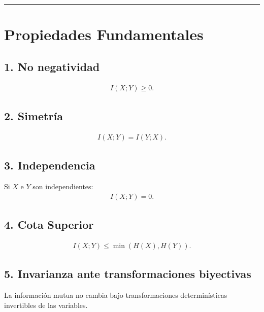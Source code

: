\documentclass[letterpaper,10pt,english]{jupyterBook}
\begin{document}
\bigskip\hrule\bigskip



\section{Propiedades Fundamentales}
\label{\detokenize{01_theory/mutual_information:propiedades-fundamentales}}

\subsection{1. No negatividad}
\label{\detokenize{01_theory/mutual_information:no-negatividad}}\begin{equation*}
\begin{split}
I(X;Y)\ge 0.
\end{split}
\end{equation*}

\subsection{2. Simetría}
\label{\detokenize{01_theory/mutual_information:simetria}}\begin{equation*}
\begin{split}
I(X;Y)=I(Y;X).
\end{split}
\end{equation*}

\subsection{3. Independencia}
\label{\detokenize{01_theory/mutual_information:independencia}}
\sphinxAtStartPar
Si \(X\) e \(Y\) son independientes:
\begin{equation*}
\begin{split}
I(X;Y)=0.
\end{split}
\end{equation*}

\subsection{4. Cota Superior}
\label{\detokenize{01_theory/mutual_information:cota-superior}}\begin{equation*}
\begin{split}
I(X;Y)\le \min(H(X),H(Y)).
\end{split}
\end{equation*}

\subsection{5. Invarianza ante transformaciones biyectivas}
\label{\detokenize{01_theory/mutual_information:invarianza-ante-transformaciones-biyectivas}}
\sphinxAtStartPar
La información mutua no cambia bajo transformaciones determinísticas
invertibles de las variables.
\end{document}
